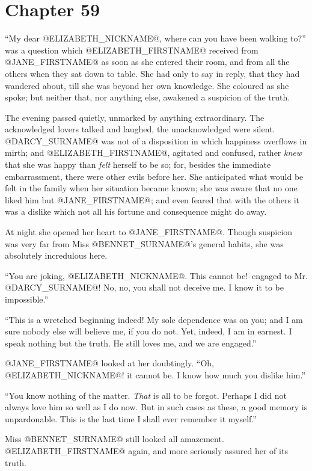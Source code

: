 \chapter*{Chapter 59}


``My dear @ELIZABETH_NICKNAME@, where can you have been walking to?'' was a question
which @ELIZABETH_FIRSTNAME@ received from @JANE_FIRSTNAME@ as soon as she entered their room,
and from all the others when they sat down to table. She had only to
say in reply, that they had wandered about, till she was beyond her own
knowledge. She coloured as she spoke; but neither that, nor anything
else, awakened a suspicion of the truth.

The evening passed quietly, unmarked by anything extraordinary. The
acknowledged lovers talked and laughed, the unacknowledged were silent.
@DARCY_SURNAME@ was not of a disposition in which happiness overflows in mirth;
and @ELIZABETH_FIRSTNAME@, agitated and confused, rather \textit{knew} that she was happy
than \textit{felt} herself to be so; for, besides the immediate embarrassment,
there were other evils before her. She anticipated what would be felt
in the family when her situation became known; she was aware that no
one liked him but @JANE_FIRSTNAME@; and even feared that with the others it was a
dislike which not all his fortune and consequence might do away.

At night she opened her heart to @JANE_FIRSTNAME@. Though suspicion was very far
from Miss @BENNET_SURNAME@'s general habits, she was absolutely incredulous here.

``You are joking, @ELIZABETH_NICKNAME@. This cannot be!--engaged to Mr. @DARCY_SURNAME@! No, no,
you shall not deceive me. I know it to be impossible.''

``This is a wretched beginning indeed! My sole dependence was on you; and
I am sure nobody else will believe me, if you do not. Yet, indeed, I am
in earnest. I speak nothing but the truth. He still loves me, and we are
engaged.''

@JANE_FIRSTNAME@ looked at her doubtingly. ``Oh, @ELIZABETH_NICKNAME@! it cannot be. I know how much
you dislike him.''

``You know nothing of the matter. \textit{That} is all to be forgot. Perhaps I
did not always love him so well as I do now. But in such cases as
these, a good memory is unpardonable. This is the last time I shall ever
remember it myself.''

Miss @BENNET_SURNAME@ still looked all amazement. @ELIZABETH_FIRSTNAME@ again, and more
seriously assured her of its truth.


